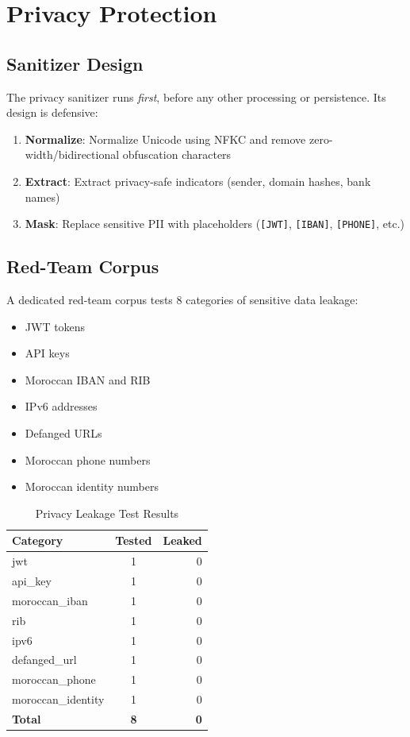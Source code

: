 \documentclass[12pt,a4paper,twoside]{report}
\begin{document}
\clearpage

\chapter{Privacy Protection}
\label{chap:privacy}

\section{Sanitizer Design}
The privacy sanitizer runs \textit{first}, before any other processing or persistence. Its design is defensive:
\begin{enumerate}
    \item \textbf{Normalize}: Normalize Unicode using NFKC and remove zero-width/bidirectional obfuscation characters
    \item \textbf{Extract}: Extract privacy-safe indicators (sender, domain hashes, bank names)
    \item \textbf{Mask}: Replace sensitive PII with placeholders (\texttt{[JWT]}, \texttt{[IBAN]}, \texttt{[PHONE]}, etc.)
\end{enumerate}

\section{Red-Team Corpus}
A dedicated red-team corpus tests 8 categories of sensitive data leakage:
\begin{itemize}[noitemsep]
    \item JWT tokens
    \item API keys
    \item Moroccan IBAN and RIB
    \item IPv6 addresses
    \item Defanged URLs
    \item Moroccan phone numbers
    \item Moroccan identity numbers
\end{itemize}

\begin{table}[h!]
    \centering
    \caption{Privacy Leakage Test Results}
    \label{tab:leakage}
    \begin{tabular}{lcr}
        \toprule
        \textbf{Category} & \textbf{Tested} & \textbf{Leaked} \\
        \midrule
        jwt & 1 & 0 \\
        api\_key & 1 & 0 \\
        moroccan\_iban & 1 & 0 \\
        rib & 1 & 0 \\
        ipv6 & 1 & 0 \\
        defanged\_url & 1 & 0 \\
        moroccan\_phone & 1 & 0 \\
        moroccan\_identity & 1 & 0 \\
        \bottomrule
        \textbf{Total} & \textbf{8} & \textbf{0} \\
    \end{tabular}
\end{table}
\end{document}
